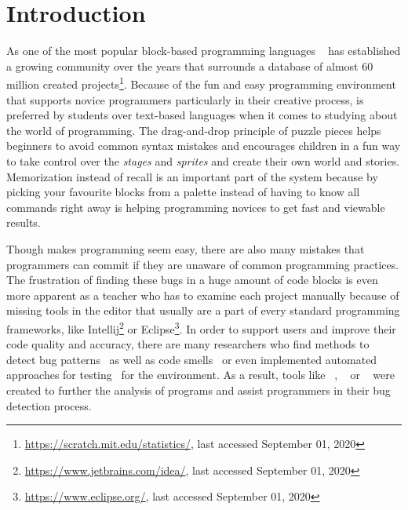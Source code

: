 \chapter{Introduction}\label{chap:introduction}

As one of the most popular block-based programming languages \scratch{}~\cite{scratch} has established a growing community over the years that surrounds a database of almost 60 million created projects\footnote{\url{https://scratch.mit.edu/statistics/}, last accessed September 01, 2020}. Because of the fun and easy programming environment that supports novice programmers particularly in their creative process, \scratch{} is preferred by students over text-based languages when it comes to studying about the world of programming. The drag-and-drop principle of puzzle pieces helps beginners to avoid common syntax mistakes and encourages children in a fun way to take control over the \textit{stages} and \textit{sprites} and create their own world and stories. Memorization instead of recall is an important part of the \scratch{} system because by picking your favourite blocks from a palette instead of having to know all commands right away is helping programming novices to get fast and viewable results. 

Though \scratch{} makes programming seem easy, there are also many mistakes that programmers can commit if they are unaware of common programming practices. The frustration of finding these bugs in a huge amount of code blocks is even more apparent as a teacher who has to examine each project manually because of missing tools in the \scratch{} editor that usually are a part of every standard programming frameworks, like Intellij\footnote{\url{https://www.jetbrains.com/idea/}, last accessed September 01, 2020} or Eclipse\footnote{\url{https://www.eclipse.org/}, last accessed September 01, 2020}. In order to support \scratch{} users and improve their code quality and accuracy, there are many researchers who find methods to detect bug patterns~\cite{scratch_bugpatterns} as well as code smells~\cite{badsmells, badhabits, hairball} or even implemented automated approaches for testing~\cite{whisker} for the \scratch{} environment. As a result, tools like \hairball~\cite{hairball}, \drscratch~\cite{drscratch} or \litterbox~\cite{scratch_bugpatterns} were created to further the analysis of \scratch{} programs and assist programmers in their bug detection process.

